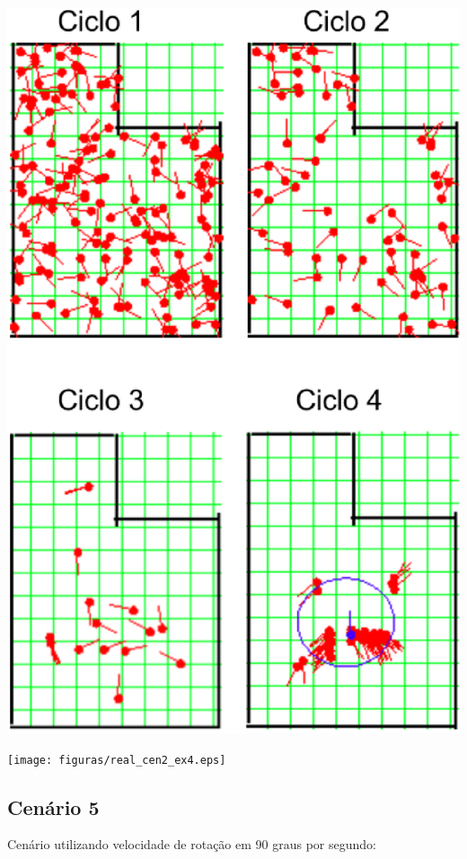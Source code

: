 {\centering
\includegraphics[scale=0.4]{figuras/cen2_ex4.eps}
\label{img:cen2_ex4}
\par}

{\centering
\texttt{[image: figuras/real\_cen2\_ex4.eps]}
\label{img:real_cen2_ex4}
\par}

\subsection{Cenário 5}

Cenário utilizando velocidade de rotação em 90 graus por segundo:

